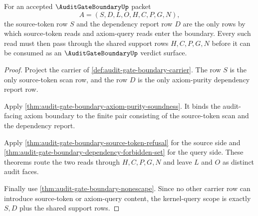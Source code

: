 \begin{theorem}
\label{thm:audit-gate-boundary-kernel-query-scope}
For an accepted $\AuditGateBoundaryUp$ packet
$$
A=(S,D,L,O,H,C,P,G,N),
$$
the source-token row $S$ and the dependency report row $D$ are the only rows by which source-token reads and axiom-query reads enter the boundary. Every such read must then pass through the shared support rows $H,C,P,G,N$ before it can be consumed as an $\AuditGateBoundaryUp$ verdict surface.
\end{theorem}
\begin{proof}
Project the carrier of \autoref{def:audit-gate-boundary-carrier}. The row $S$ is the only source-token scan row, and the row $D$ is the only axiom-purity dependency report row.

Apply \autoref{thm:audit-gate-boundary-axiom-purity-soundness}. It binds the audit-facing axiom boundary to the finite pair consisting of the source-token scan and the dependency report.

Apply \autoref{thm:audit-gate-boundary-source-token-refusal} for the source side and \autoref{thm:audit-gate-boundary-dependency-forbidden-set} for the query side. These theorems route the two reads through $H,C,P,G,N$ and leave $L$ and $O$ as distinct audit faces.

Finally use \autoref{thm:audit-gate-boundary-nonescape}. Since no other carrier row can introduce source-token or axiom-query content, the kernel-query scope is exactly $S,D$ plus the shared support rows.
\end{proof}

